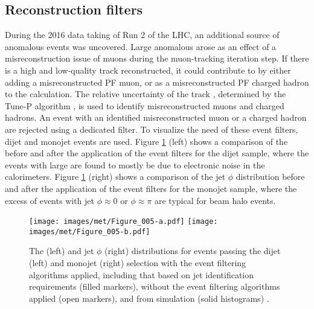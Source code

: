\subsection*{Reconstruction filters}
\noindent\justify
During the 2016 data taking of Run 2 of the LHC, an additional source of anomalous \ptmiss events was uncovered.  
Large anomalous \ptmiss arose as an effect of a misreconstruction issue of muons during the muon-tracking iteration step. 
If there is a high \pt and low-quality track reconstructed, it could contribute to \ptmiss by either adding a misreconstructed PF muon, or as a misreconstructed PF charged hadron to the \ptmiss calculation. 
The relative \pt uncertainty of the track \pt, determined by the Tune-P algorithm \cite{Sirunyan:2018fpa}, is used to identify misreconstructed muons and charged hadrons. 
An event with an identified misreconstructed muon or a charged hadron are rejected using a dedicated filter. 
\newpara
\noindent\justify
To visualize the need of these event filters, dijet and monojet events are used. 
Figure \ref{fig:dijet} (left) shows a comparison of the \ptmiss before and after the application of the event filters for the dijet sample, where the events with large \ptmiss are found to mostly be due to electronic noise in the calorimeters.
Figure \ref{fig:dijet} (right) shows a comparison of the jet $\phi$ distribution before and after the application of the event filters for the monojet sample, where the excess of events with jet $\phi\approx 0$ or $\phi\approx\pi$ are typical for beam halo events. 
\begin{figure}[!htp]
\centering
\texttt{[image: images/met/Figure\_005-a.pdf]}
\texttt{[image: images/met/Figure\_005-b.pdf]}
\caption{The \ptmiss (left) and jet $\phi$ (right) distributions for events passing the dijet (left) and monojet (right) selection with the event filtering algorithms applied, including that based
on jet identification requirements (filled markers), without the event filtering algorithms applied (open markers), and from simulation (solid histograms) \cite{Sirunyan:2019kia}. }
\label{fig:dijet}
\end{figure}                                                                                                                                                                                    
